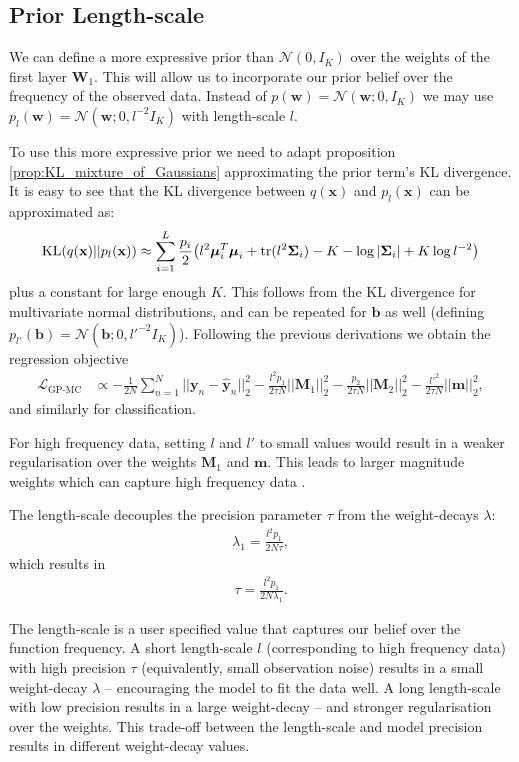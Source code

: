 \documentclass{article} %
\newcommand{\N}{\mathcal{N}}
\newcommand{\cL}{\mathcal{L}}
\newcommand{\x}{\mathbf{x}}
\newcommand{\Bb}{\mathbf{b}}
\newcommand{\y}{\mathbf{y}}
\newcommand{\w}{\mathbf{w}}
\newcommand{\W}{\mathbf{W}}
\newcommand{\m}{\mathbf{m}}
\newcommand{\M}{\mathbf{M}}
\newcommand{\bSigma}{\text{\boldmath$\Sigma$}}
\newcommand{\bmu}{\text{\boldmath$\mu$}}
\newcommand{\tr}{\text{tr}}
\newcommand{\KL}{\text{KL}}
\newcommand{\weightdecay}{\lambda}
\theoremstyle{definition}
\begin{document}
\subsection{Prior Length-scale}
We can define a more expressive prior than $\N(0,I_K)$ over the weights of the first layer $\W_1$. This will allow us to incorporate our prior belief over the frequency of the observed data. Instead of $p(\w) = \N(\w; 0, I_K)$ we may use $p_l(\w) = \N(\w; 0, l^{-2} I_K)$ with length-scale $l$. 

To use this more expressive prior we need to adapt proposition \ref{prop:KL_mixture_of_Gaussians} approximating the prior term's KL divergence. It is easy to see that the KL divergence between $q(\x)$ and $p_l(\x)$ can be approximated as:
\begin{align*}
\KL(q(\x) || p_l(\x)) \approx
\sum_{i=1}^L \frac{p_i}{2} \big( l^{2} \bmu_i^T \bmu_i + \tr ( l^{2} \bSigma_i ) - K - \log | \bSigma_i | + K \log l^{-2} \big)
\end{align*}
plus a constant for large enough $K$. This follows from the KL divergence for multivariate normal distributions, and can be repeated for $\Bb$ as well (defining $p_{l'}(\Bb) = \N(\Bb; 0, l'^{-2} I_K)$). Following the previous derivations we obtain the regression objective
\begin{align*}
\cL_{\text{GP-MC}} &\propto  - \frac{1}{2 N} \sum_{n=1}^N || \y_n - \widehat{\y}_n ||^2_2 - \frac{l^2 p_1}{2 \tau N} ||\M_1||^2_2 - \frac{p_2}{2 \tau N} ||\M_2||^2_2 - \frac{l'^2}{2 \tau N}||\m||^2_2,
\end{align*}
and similarly for classification.

For high frequency data, setting $l$ and $l'$ to small values would result in a weaker regularisation over the weights $\M_1$ and $\m$. This leads to larger magnitude weights which can capture high frequency data \citep{Gal2015Improving}. 

The length-scale decouples the precision parameter $\tau$ from the weight-decays $\weightdecay$:
\begin{align}\label{eq:weightdecay_tau_relation}
\weightdecay_1 = \frac{l^2 p_1}{2 N \tau},
\end{align}
which results in
\begin{align}\label{eq:tau_weightdecay_relation}
\tau = \frac{l^2 p_1}{2 N \weightdecay_1}.
\end{align}

The length-scale is a user specified value that captures our belief over the function frequency. A short length-scale $l$ (corresponding to high frequency data) with high precision $\tau$ (equivalently, small observation noise) results in a small weight-decay $\lambda$ -- encouraging the model to fit the data well. A long length-scale with low precision results in a large weight-decay -- and stronger regularisation over the weights. This trade-off between the length-scale and model precision results in different weight-decay values. 
\end{document}

